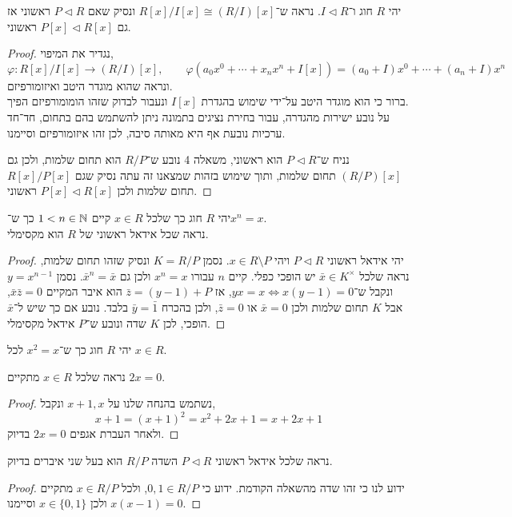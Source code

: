\question{}
יהי $R$ חוג ו־$I \triangleleft R$.
נראה ש־$R[x] / I[x] \cong (R / I)[x]$ ונסיק שאם $P \triangleleft R$ ראשוני אז גם $P[x] \triangleleft R[x]$ ראשוני.
\begin{proof}
	נגדיר את המיפוי,
	\[
		\varphi : R[x] / I[x] \to (R / I)[x],
		\qquad
		\varphi(a_0 x^0 + \cdots + x_n x^n + I[x])
		= (a_0 + I) x^0 + \cdots + (a_n + I) x^n
	\]
	ונראה שהוא מוגדר היטב ואיזומורפיזם. \\
	ברור כי הוא מוגדר היטב על־ידי שימוש בהגדרת $I[x]$ ונעבור לבדוק שזהו הומומורפיזם הפיך. \\
	על נובע ישירות מהגדרה, עבור בחירת נציגים בתמונה ניתן להשתמש בהם בתחום, חד־חד ערכיות נובעת אף היא מאותה סיבה, לכן זהו איזומורפיזם וסיימנו.

	נניח ש־$P \triangleleft R$ הוא ראשוני,
	משאלה 4 נובע ש־$R / P$ הוא תחום שלמות, ולכן גם $(R / P)[x]$ תחום שלמות, ותוך שימוש בזהות שמצאנו זה עתה נסיק שגם $R[x] / P[x]$ תחום שלמות ולכן $P[x] \triangleleft R[x]$ ראשוני.
\end{proof}

\question{}
יהי $R$ חוג כך שלכל $x \in R$ קיים $1 < n \in \mathbb{N}$ כך ש־$x^n = x$. \\
נראה שכל אידאל ראשוני של $R$ הוא מקסימלי.
\begin{proof}
	יהי אידאל ראשוני $P \triangleleft R$ ויהי $x \in R \setminus P$.
	נסמן $K = R / P$ ונסיק שזהו תחום שלמות, נראה שלכל $\bar{x} \in K^\times$ יש הופכי כפלי.
	קיים $n$ עבורו $x^n = x$ ולכן גם $\bar{x}^n = \bar{x}$.
	נסמן $y = x^{n - 1}$ ונקבל ש־$y x = x \iff x (y - 1) = 0$, אז $\bar{z} = (y - 1) + P$ הוא איבר המקיים $\bar{x} \bar{z} = 0$, אבל $K$ תחום שלמות ולכן $\bar{x} = 0$ או $\bar{z} = 0$, ולכן בהכרח $\bar{y} = \bar{1}$ בלבד.
	נובע אם כך שיש ל־$\bar{x}$ הופכי, לכן $K$ שדה ונובע ש־$P$ אידאל מקסימלי.
\end{proof}

\question{}
יהי $R$ חוג כך ש־$x^2 = x$ לכל $x \in R$.

\subquestion{}
נראה שלכל $x \in R$ מתקיים $2 x = 0$.
\begin{proof}
	נשתמש בהנחה שלנו על $x + 1, x$ ונקבל,
	\[
		x + 1
		= {(x + 1)}^2
		= x^2 + 2x + 1
		= x + 2 x + 1
	\]
	ולאחר העברת אגפים $2 x = 0$ בדיוק.
\end{proof}

\subquestion{}
נראה שלכל אידאל ראשוני $P \triangleleft R$ השדה $R / P$ הוא בעל שני איברים בדיוק.
\begin{proof}
	ידוע לנו כי זהו שדה מהשאלה הקודמת.
	ידוע כי $0, 1 \in R / P$, ולכל $x \in R / P$ מתקיים $x (x - 1) = 0$ ולכן $x \in \{0, 1\}$ וסיימנו.
\end{proof}

